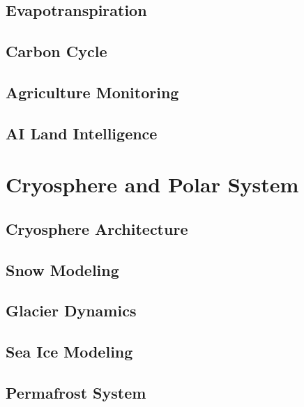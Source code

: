 \documentclass[11pt,a4paper,oneside]{report}
\begin{document}
\chapter{Evapotranspiration}



\chapter{Carbon Cycle}



\chapter{Agriculture Monitoring}



\chapter{AI Land Intelligence}



\part{Cryosphere and Polar System}


\chapter{Cryosphere Architecture}



\chapter{Snow Modeling}



\chapter{Glacier Dynamics}



\chapter{Sea Ice Modeling}



\chapter{Permafrost System}

\end{document}
